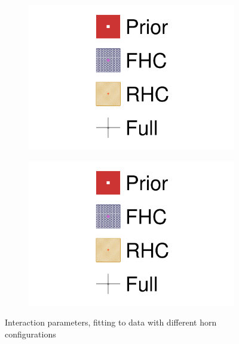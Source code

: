 \begin{figure}[h]
	\begin{subfigure}[t]{0.49\textwidth}
		\includegraphics[width=\textwidth,page=20, trim={0mm 0mm 0mm 9mm}, clip]{figures/mach3/2018/data/2018a_FixedCov_RedCov_Mpi_NeuOnly_Data_merge_2018a_FixedCov_RedCov_Mpi_NeuBarOnly_Data_merge_2018a_FixedCov_RedCov_Mpi_Data_merge}
	\end{subfigure}
	\begin{subfigure}[t]{0.49\textwidth}
		\includegraphics[width=\textwidth,page=21, trim={0mm 0mm 0mm 9mm}, clip]{figures/mach3/2018/data/2018a_FixedCov_RedCov_Mpi_NeuOnly_Data_merge_2018a_FixedCov_RedCov_Mpi_NeuBarOnly_Data_merge_2018a_FixedCov_RedCov_Mpi_Data_merge}
	\end{subfigure}
	\caption{Interaction parameters, fitting to data with different horn configurations}
	\label{fig:data_fhcvsrhc_2018_xsec}
\end{figure}

